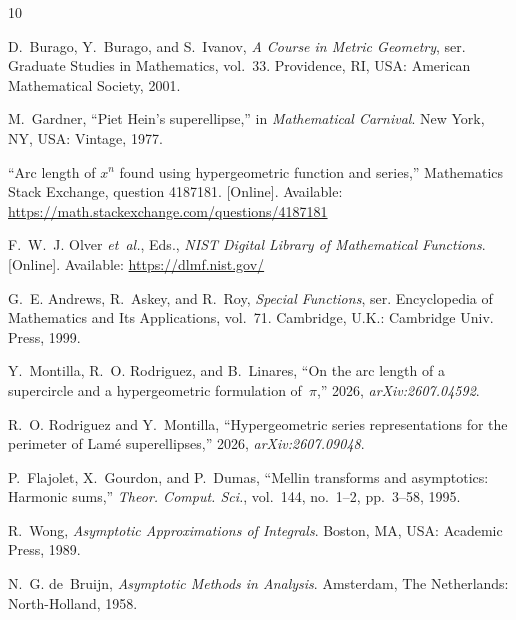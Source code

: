 \documentclass[journal]{IEEEtran}
\begin{document}
\begin{thebibliography}{10}

D.~Burago, Y.~Burago, and S.~Ivanov, \emph{A Course in Metric Geometry}, ser. Graduate Studies
in Mathematics, vol.~33. Providence, RI, USA: American Mathematical Society, 2001.

M.~Gardner, ``Piet Hein's superellipse,'' in \emph{Mathematical Carnival}. New York, NY, USA:
Vintage, 1977.

``Arc length of $x^n$ found using hypergeometric function and series,'' Mathematics Stack
Exchange, question 4187181. [Online]. Available:
\url{https://math.stackexchange.com/questions/4187181}

F.~W.~J. Olver \emph{et~al.}, Eds., \emph{NIST Digital Library of Mathematical Functions}.
[Online]. Available: \url{https://dlmf.nist.gov/}

G.~E. Andrews, R.~Askey, and R.~Roy, \emph{Special Functions}, ser. Encyclopedia of Mathematics
and Its Applications, vol.~71. Cambridge, U.K.: Cambridge Univ. Press, 1999.

Y.~Montilla, R.~O. Rodriguez, and B.~Linares, ``On the arc length of a supercircle and a
hypergeometric formulation of~$\pi$,'' 2026, \emph{arXiv:2607.04592}.

R.~O. Rodriguez and Y.~Montilla, ``Hypergeometric series representations for the perimeter of
Lam\'e superellipses,'' 2026, \emph{arXiv:2607.09048}.

P.~Flajolet, X.~Gourdon, and P.~Dumas, ``Mellin transforms and asymptotics: Harmonic sums,''
\emph{Theor. Comput. Sci.}, vol.~144, no.~1--2, pp.~3--58, 1995.

R.~Wong, \emph{Asymptotic Approximations of Integrals}. Boston, MA, USA: Academic Press, 1989.

N.~G. de~Bruijn, \emph{Asymptotic Methods in Analysis}. Amsterdam, The Netherlands:
North-Holland, 1958.

\end{thebibliography}
\end{document}
